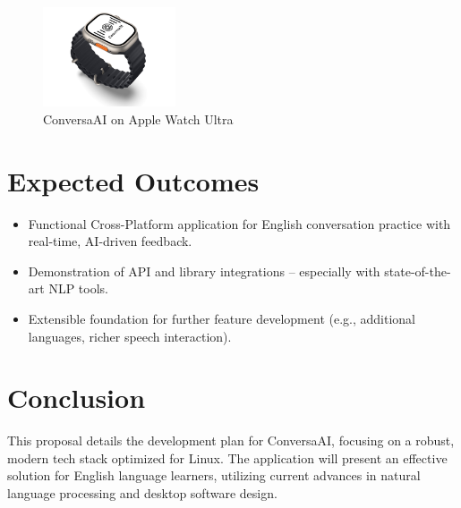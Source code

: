 \documentclass[12pt]{article}
\begin{document}
\begin{figure}[h!]
    \centering
    \includegraphics[width=0.35\textwidth]{Apple_Watch_Ultra.png} %
    \caption{ConversaAI on Apple Watch Ultra}
    \label{fig:watch_ui}
\end{figure}


\section*{Expected Outcomes}

\begin{itemize}
    \item Functional Cross-Platform application for English conversation practice with real-time, AI-driven feedback.
    \item Demonstration of API and library integrations -- especially with state-of-the-art NLP tools.
    \item Extensible foundation for further feature development (e.g., additional languages, richer speech interaction).
\end{itemize}

\section*{Conclusion}

This proposal details the development plan for ConversaAI, focusing on a robust, modern tech stack optimized for Linux. The application will present an effective solution for English language learners, utilizing current advances in natural language processing and desktop software design.
\end{document}

